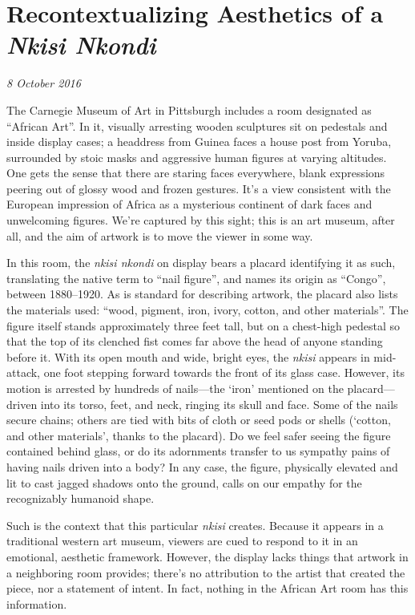 \section{Recontextualizing Aesthetics of a \textit{Nkisi Nkondi}}

\textit{8 October 2016}

The Carnegie Museum of Art in Pittsburgh includes a room designated as ``African
Art''. In it, visually arresting wooden sculptures sit on pedestals and inside
display cases; a headdress from Guinea faces a house post from Yoruba,
surrounded by stoic masks and aggressive human figures at varying altitudes. One
gets the sense that there are staring faces everywhere, blank expressions
peering out of glossy wood and frozen gestures. It's a view consistent with the
European impression of Africa as a mysterious continent of dark faces and
unwelcoming figures. We're captured by this sight; this is an art museum, after
all, and the aim of artwork is to move the viewer in some way.

In this room, the \textit{nkisi nkondi} on display bears a placard identifying
it as such, translating the native term to ``nail figure'', and names its origin
as ``Congo'', between 1880--1920. As is standard for describing artwork, the
placard also lists the materials used: ``wood, pigment, iron, ivory, cotton, and
other materials''. The figure itself stands approximately three feet tall, but
on a chest-high pedestal so that the top of its clenched fist comes far above
the head of anyone standing before it. With its open mouth and wide, bright
eyes, the \textit{nkisi} appears in mid-attack, one foot stepping forward
towards the front of its glass case.  However, its motion is arrested by
hundreds of nails---the `iron' mentioned on the placard---driven into its torso,
feet, and neck, ringing its skull and face. Some of the nails secure chains;
others are tied with bits of cloth or seed pods or shells (`cotton, and other
materials', thanks to the placard). Do we feel safer seeing the figure contained
behind glass, or do its adornments transfer to us sympathy pains of having nails
driven into a body? In any case, the figure, physically elevated and lit to cast
jagged shadows onto the ground, calls on our empathy for the recognizably
humanoid shape.

Such is the context that this particular \textit{nkisi} creates. Because it
appears in a traditional western art museum, viewers are cued to respond to it
in an emotional, aesthetic framework. However, the display lacks things that
artwork in a neighboring room provides; there's no attribution to the artist
that created the piece, nor a statement of intent. In fact, nothing in the
African Art room has this information.

